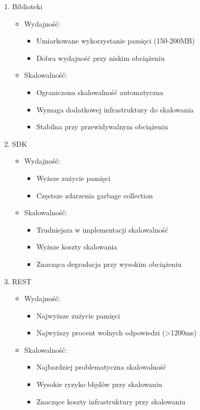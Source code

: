 \documentclass[runningheads,12pt]{llncs}
\begin{document}
\begin{enumerate}
    \item Biblioteki
    \begin{itemize}
        \item Wydajność:
        \begin{itemize}
            \item Umiarkowane wykorzystanie pamięci (150-200MB)
            \item Dobra wydajność przy niskim obciążeniu
        \end{itemize}
        \item Skalowalność:
        \begin{itemize}
            \item Ograniczona skalowalność automatyczna
            \item Wymaga dodatkowej infrastruktury do skalowania
            \item Stabilna przy przewidywalnym obciążeniu
        \end{itemize}
    \end{itemize}

    \item SDK
    \begin{itemize}
        \item Wydajność:
        \begin{itemize}
            \item Wyższe zużycie pamięci
            \item Częstsze zdarzenia garbage collection
        \end{itemize}
        \item Skalowalność:
        \begin{itemize}
            \item Trudniejsza w implementacji skalowalność
            \item Wyższe koszty skalowania
            \item Znacząca degradacja przy wysokim obciążeniu
        \end{itemize}
    \end{itemize}

    \item REST
    \begin{itemize}
        \item Wydajność:
        \begin{itemize}
            \item Najwyższe zużycie pamięci
            \item Najwyższy procent wolnych odpowiedzi (>1200ms)
        \end{itemize}
        \item Skalowalność:
        \begin{itemize}
            \item Najbardziej problematyczna skalowalność
            \item Wysokie ryzyko błędów przy skalowaniu
            \item Znaczące koszty infrastruktury przy skalowaniu
        \end{itemize}
    \end{itemize}
\end{enumerate}
\end{document}
